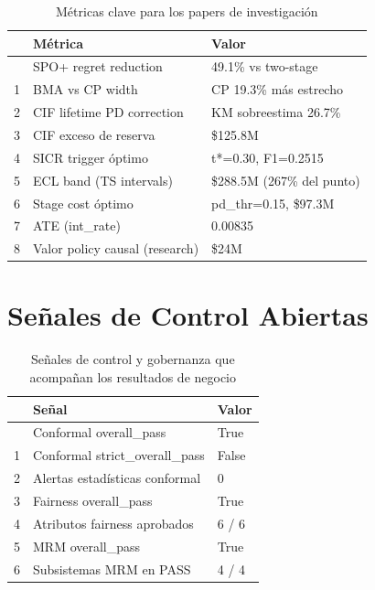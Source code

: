 \documentclass[
  spanish,
  11pt,
  letterpaper,
]{scrbook}
\theoremstyle{plain}
\theoremstyle{remark}
\begin{document}
{

\begin{longtable}[]{@{}lll@{}}

\caption{\label{tbl-research-metrics}Métricas clave para los papers de
investigación}

\tabularnewline

\toprule\noalign{}
& Métrica & Valor \\
\midrule\noalign{}
\endhead
\bottomrule\noalign{}
\endlastfoot
0 & SPO+ regret reduction & 49.1\% vs two-stage \\
1 & BMA vs CP width & CP 19.3\% más estrecho \\
2 & CIF lifetime PD correction & KM sobreestima 26.7\% \\
3 & CIF exceso de reserva & \$125.8M \\
4 & SICR trigger óptimo & t*=0.30, F1=0.2515 \\
5 & ECL band (TS intervals) & \$288.5M (267\% del punto) \\
6 & Stage cost óptimo & pd\_thr=0.15, \$97.3M \\
7 & ATE (int\_rate) & 0.00835 \\
8 & Valor policy causal (research) & \$24M \\

\end{longtable}

}

\section{Señales de Control
Abiertas}\label{seuxf1ales-de-control-abiertas}

{

\begin{longtable}[]{@{}lll@{}}

\caption{\label{tbl-control-metrics}Señales de control y gobernanza que
acompañan los resultados de negocio}

\tabularnewline

\toprule\noalign{}
& Señal & Valor \\
\midrule\noalign{}
\endhead
\bottomrule\noalign{}
\endlastfoot
0 & Conformal overall\_pass & True \\
1 & Conformal strict\_overall\_pass & False \\
2 & Alertas estadísticas conformal & 0 \\
3 & Fairness overall\_pass & True \\
4 & Atributos fairness aprobados & 6 / 6 \\
5 & MRM overall\_pass & True \\
6 & Subsistemas MRM en PASS & 4 / 4 \\

\end{longtable}

}
\end{document}
